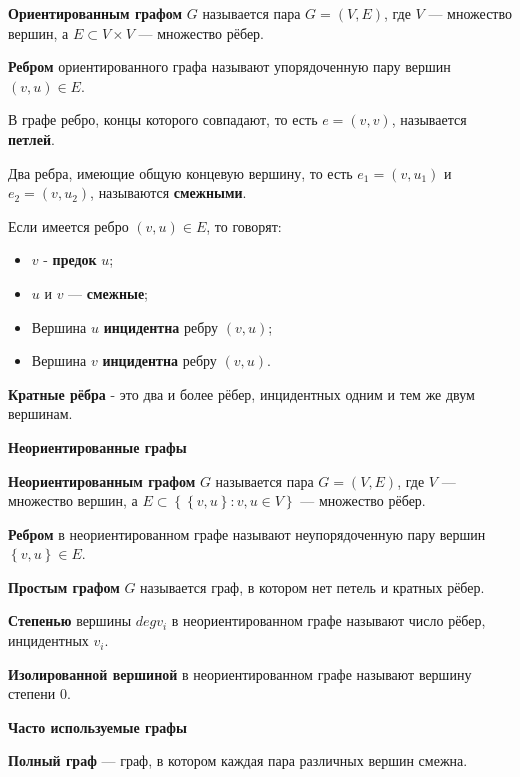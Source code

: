 \documentclass[12pt]{matmex-diploma}
\begin{document}
            \textbf{Ориентированным графом} $G$ называется пара $G = (V, E)$, где $V$ — множество вершин, а $E \subset V \times V$ — множество рёбер.
            
            \textbf{Ребром} ориентированного графа называют упорядоченную пару вершин $(v, u) \in E$.
            
            В графе ребро, концы которого совпадают, то есть $e = (v,v)$, называется \textbf{петлей}.
            
            Два ребра, имеющие общую концевую вершину, то есть $e_1 = (v,u_1)$ и $e_2 = (v,u_2)$, называются \textbf{смежными}.
            
            Если имеется ребро $(v, u) \in E$, то говорят:
            \begin{itemize}
                \item $v$ - \textbf{предок} $u$;
                \item $u$ и $v$ — \textbf{смежные};
                \item Вершина $u$ \textbf{инцидентна} ребру $(v, u)$;
                \item Вершина $v$ \textbf{инцидентна} ребру $(v, u)$.
            \end{itemize} 
            
            \textbf{Кратные рёбра} - это два и более рёбер, инцидентных одним и тем же двум вершинам.
            
            \textbf{Неориентированные графы}
            
            \textbf{Неориентированным графом} $G$ называется пара $G = (V, E)$, где $V$ — множество вершин, а $E \subset \left\{ {\left\{ v, u \right\}} : v,u \in V \right\}$ — множество рёбер.
            
            \textbf{Ребром} в неориентированном графе называют неупорядоченную пару вершин ${\left\{ v, u \right\}} \in E$.
            
            \textbf{Простым графом} $G$ называется граф, в котором нет петель и кратных рёбер.
            
            \textbf{Степенью} вершины $deg v_i$ в неориентированном графе называют число рёбер, инцидентных $v_i$.
            
            \textbf{Изолированной вершиной} в неориентированном графе называют вершину степени 0.
            
            \textbf{Часто используемые графы}
            
            \textbf{Полный граф} — граф, в котором каждая пара различных вершин смежна.
            
\end{document}
